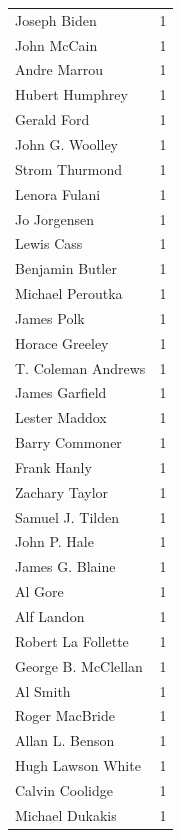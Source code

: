 \documentclass[
  letterpaper,
  DIV=11,
  numbers=noendperiod]{scrreprt}
\begin{document}
\begin{tabular}{lr}
Joseph Biden           &          1 \\
John McCain            &          1 \\
Andre Marrou           &          1 \\
Hubert Humphrey        &          1 \\
Gerald Ford            &          1 \\
John G. Woolley        &          1 \\
Strom Thurmond         &          1 \\
Lenora Fulani          &          1 \\
Jo Jorgensen           &          1 \\
Lewis Cass             &          1 \\
Benjamin Butler        &          1 \\
Michael Peroutka       &          1 \\
James Polk             &          1 \\
Horace Greeley         &          1 \\
T. Coleman Andrews     &          1 \\
James Garfield         &          1 \\
Lester Maddox          &          1 \\
Barry Commoner         &          1 \\
Frank Hanly            &          1 \\
Zachary Taylor         &          1 \\
Samuel J. Tilden       &          1 \\
John P. Hale           &          1 \\
James G. Blaine        &          1 \\
Al Gore                &          1 \\
Alf Landon             &          1 \\
Robert La Follette     &          1 \\
George B. McClellan    &          1 \\
Al Smith               &          1 \\
Roger MacBride         &          1 \\
Allan L. Benson        &          1 \\
Hugh Lawson White      &          1 \\
Calvin Coolidge        &          1 \\
Michael Dukakis        &          1 \\

\end{tabular}
\end{document}
